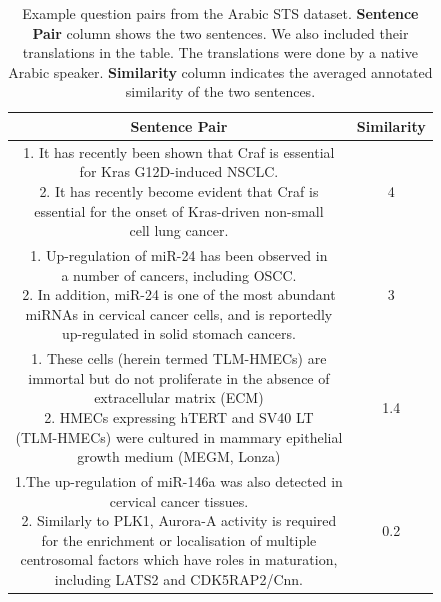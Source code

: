 \begin{enumerate}
	\begin{table}[ht!]
		\centering
			\begin{tabular}{c|c}
				\hline
				\multicolumn{1}{c|}{\textbf{Sentence Pair}} & 
				\multicolumn{1}{c}{\textbf{Similarity}}  \\
				\hline
				\makecell[l]{1. It has recently been shown that Craf is essential \\ for Kras G12D-induced NSCLC. \\ 
					2. It has recently become evident that Craf is \\ essential for the onset of Kras-driven non-small \\ cell lung cancer.} & 4  \\
				\hline
				\makecell[l]{1. Up-regulation of miR-24 has been observed in \\ a number of cancers, including OSCC. \\ 
					2. In addition, miR-24 is one of the most abundant \\ miRNAs in cervical cancer cells, and is reportedly \\ up-regulated in solid stomach cancers. } & 3 \\
				\hline
				\makecell[l]{1. These cells (herein termed TLM-HMECs) are \\ immortal but do not proliferate in the absence of \\ extracellular matrix (ECM) \\  
					2. HMECs expressing hTERT and SV40 LT \\ (TLM-HMECs) were cultured in mammary epithelial \\ growth medium (MEGM, Lonza)  } & 1.4  \\
				\hline
				\makecell[l]{1.The up-regulation of miR-146a was also detected in \\ cervical cancer tissues.  \\ 
					2. Similarly to PLK1, Aurora-A activity is required \\ for the enrichment or localisation of multiple \\ centrosomal  factors which have roles in maturation, \\ including LATS2 and CDK5RAP2/Cnn.} & 0.2  \\
				\hline               
			\end{tabular}
		\caption[Example question pairs from the Arabic STS dataset]{Example question  pairs from the Arabic STS dataset. \textbf{Sentence Pair} column shows the two sentences. We also included their translations in the table. The translations were done by a native Arabic speaker. \textbf{Similarity} column indicates the averaged annotated similarity of the two sentences.}
		\label{tab:biomeddata}
	\end{table} 
	

\end{enumerate}
